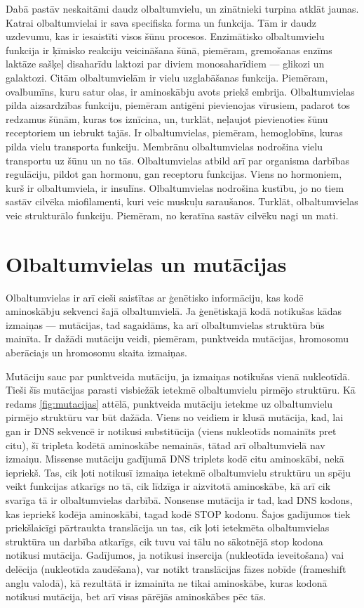\documentclass[12pt,a4paper]{article}
\begin{document}
Dabā pastāv neskaitāmi daudz olbaltumvielu, un zinātnieki turpina atklāt jaunas. Katrai olbaltumvielai ir sava specifiska forma un funkcija. Tām ir daudz uzdevumu, kas ir iesaistīti visos šūnu procesos. Enzimātisko olbaltumvielu funkcija ir ķīmisko reakciju veicināšana šūnā, piemēram, gremošanas enzīms laktāze sašķeļ disaharīdu laktozi par diviem monosaharīdiem — glikozi un galaktozi. Citām olbaltumvielām ir vielu uzglabāšanas funkcija. Piemēram, ovalbumīns, kuru satur olas, ir aminoskābju avots priekš embrija. Olbaltumvielas pilda aizsardzības funkciju, piemēram antigēni pievienojas vīrusiem, padarot tos redzamus šūnām, kuras tos iznīcina, un, turklāt, neļaujot pievienoties šūnu receptoriem un iebrukt tajās. Ir olbaltumvielas, piemēram, hemoglobīns, kuras pilda vielu transporta funkciju. Membrānu olbaltumvielas nodrošina vielu transportu uz šūnu un no tās. Olbaltumvielas atbild arī par organisma darbības regulāciju, pildot gan hormonu, gan receptoru funkcijas. Viens no hormoniem, kurš ir olbaltumviela, ir insulīns. Olbaltumvielas nodrošina kustību, jo no tiem sastāv cilvēka miofilamenti, kuri veic muskuļu saraušanos. Turklāt, olbaltumvielas veic strukturālo funkciju. Piemēram, no keratīna sastāv cilvēku nagi un mati.


\section{Olbaltumvielas un mutācijas}

Olbaltumvielas ir arī cieši saistītas ar ģenētisko informāciju, kas kodē aminoskābju sekvenci šajā olbaltumvielā. Ja ģenētiskajā kodā notikušas kādas izmaiņas — mutācijas, tad sagaidāms, ka arī olbaltumvielas struktūra būs mainīta. Ir dažādi mutāciju veidi, piemēram, punktveida mutācijas, hromosomu aberāciajs un hromosomu skaita izmaiņas.

Mutāciju sauc par punktveida mutāciju, ja izmaiņas notikušas vienā nukleotīdā. Tieši šīs mutācijas parasti visbiežāk ietekmē olbaltumvielu pirmējo struktūru. Kā redams \ref{fig:mutacijas} attēlā, punktveida mutāciju ietekme uz olbaltumvielu pirmējo struktūru var būt dažāda. Viens no veidiem ir klusā mutācija, kad, lai gan ir DNS sekvencē ir notikusi substitūcija (viens nukleotīds nomainīts pret citu), šī tripleta kodētā aminoskābe nemainās, tātad arī olbaltumvielā nav izmaiņu. Missense mutāciju gadījumā DNS triplets kodē citu aminoskābi, nekā iepriekš. Tas, cik ļoti notikusī izmaiņa ietekmē olbaltumvielu struktūru un spēju veikt funkcijas atkarīgs no tā, cik līdzīga ir aizvitotā aminoskābe, kā arī cik svarīga tā ir olbaltumvielas darbībā. Nonsense mutācija ir tad, kad DNS kodons, kas iepriekš kodēja aminoskābi, tagad kodē STOP kodonu. Šajos gadījumos tiek priekšlaicīgi pārtraukta translācija un tas, cik ļoti ietekmēta olbaltumvielas struktūra un darbība atkarīgs, cik tuvu vai tālu no sākotnējā stop kodona notikusi mutācija. Gadījumos, ja notikusi insercija (nukleotīda ieveitošana) vai delēcija (nukleotīda zaudēšana), var notikt translācijas fāzes nobīde (frameshift angļu valodā), kā rezultātā ir izmainīta ne tikai aminoskābe, kuras kodonā notikusi mutācija, bet arī visas pārējās aminoskābes pēc tās.
\end{document}
